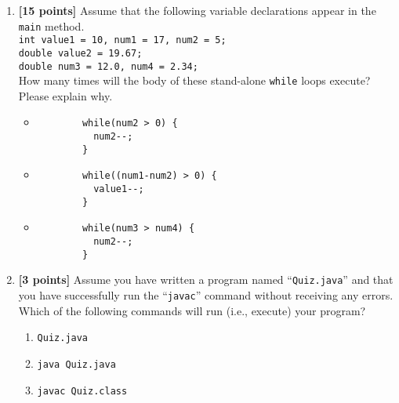 \begin{enumerate}
\begin{itemize}
\end{itemize}

\vspace{2.5in}

\item {\bf [15 points]}
  Assume that the following variable declarations appear in the {\tt main} method.\\ 

{\tt int value1 = 10, num1 = 17, num2 = 5;}\\
{\tt double value2 = 19.67;}\\
{\tt double num3 = 12.0, num4 = 2.34;}\\ 

\noindent
How many times will the body of these stand-alone {\tt while} loops execute? Please explain why.
 
 \begin{itemize}
 \item
     \begin{verbatim}
        while(num2 > 0) {
          num2--;
        }
     \end{verbatim}
 
 \item 
 \begin{verbatim}
        while((num1-num2) > 0) {
          value1--;
        }
     \end{verbatim}

 \item 
 \begin{verbatim}
        while(num3 > num4) {
          num2--;
        }
     \end{verbatim}

\vspace{0.3in}
 \end{itemize}


\item {\bf [3 points]}
Assume you have written a program named ``{\tt Quiz.java}'' and that you have 
successfully run the ``{\tt javac}'' command without receiving any  errors. 
Which of the following commands will run (i.e., execute) your program?
\begin{enumerate}
\item \verb$Quiz.java$

\medskip
\item \verb$java Quiz.java$

\medskip
\item \verb$javac Quiz.class$


\end{enumerate}
\end{enumerate}

